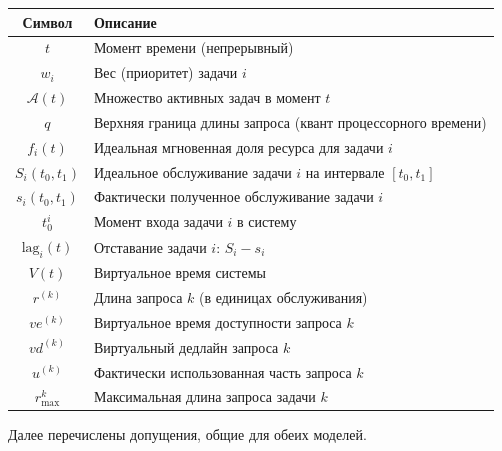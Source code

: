 \documentclass[14pt, oneside]{extbook}
\begin{document}
\vspace{1em}
\noindent\begin{minipage}{\textwidth}
\centering
{}
\label{tab:notation_eevdf}
\vspace{0.4em}
\begin{tabular}{|c|p{11cm}|}
        \hline
        \textbf{Символ} & \textbf{Описание} \\
        \hline
        $t$ & Момент времени (непрерывный) \\
        $w_i$ & Вес (приоритет) задачи $i$ \\
        $\mathcal{A}(t)$ & Множество активных задач
              в момент $t$ \\
        $q$ & Верхняя граница длины запроса
              (квант процессорного времени) \\
        $f_i(t)$ & Идеальная мгновенная доля ресурса
              для задачи $i$ \\
        $S_i(t_0, t_1)$ & Идеальное обслуживание
              задачи $i$ на интервале $[t_0, t_1]$ \\
        $s_i(t_0, t_1)$ & Фактически полученное
              обслуживание задачи $i$ \\
        $t_0^i$ & Момент входа задачи $i$ в систему \\
        $\mathrm{lag}_i(t)$ & Отставание задачи $i$:
              $S_i - s_i$ \\
        $V(t)$ & Виртуальное время системы \\
        $r^{(k)}$ & Длина запроса $k$ (в единицах
              обслуживания) \\
        $ve^{(k)}$ & Виртуальное время доступности
              запроса $k$ \\
        $vd^{(k)}$ & Виртуальный дедлайн запроса $k$ \\
        $u^{(k)}$ & Фактически использованная часть
              запроса $k$ \\
        $r_{\max}^k$ & Максимальная длина запроса
              задачи $k$ \\
        \hline
\end{tabular}
\end{minipage}

\vspace{2em}

        Далее перечислены допущения, общие для обеих моделей.
\end{document}
